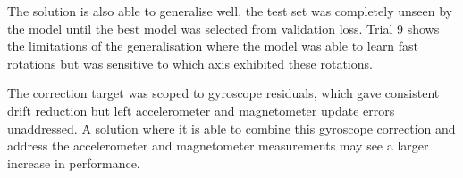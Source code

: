 The solution is also able to generalise well, the test set was completely unseen by the model until
the best model was selected from validation loss. Trial 9 shows the limitations of the generalisation where the model was able to
learn fast rotations but was sensitive to which axis exhibited these rotations.

The correction target was scoped to gyroscope residuals, which gave consistent drift reduction but left accelerometer and 
magnetometer update errors unaddressed. A solution where it is able to combine this
gyroscope correction and address the accelerometer and magnetometer measurements may see a larger increase in performance. 


